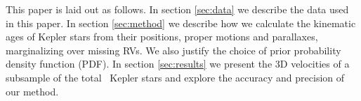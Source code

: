 
This paper is laid out as follows.
In section \ref{sec:data} we describe the data used in this paper.
In section \ref{sec:method} we describe how we calculate the kinematic ages of
Kepler stars from their positions, proper motions and parallaxes,
marginalizing over missing RVs.
We also justify the choice of prior probability density function (PDF).
In section \ref{sec:results} we present the 3D velocities of a subsample  of
the total \nstars\ Kepler stars and explore the accuracy and precision of our
method.

